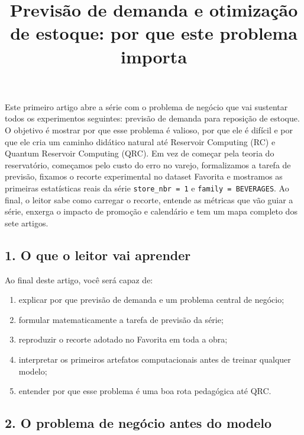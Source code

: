 \documentclass[12pt]{article}
\title{Previsão de demanda e otimização de estoque: por que este problema importa}
\author{}
\providecommand{\tightlist}{%
          \setlength{\itemsep}{0pt}\setlength{\parskip}{0pt}}
\begin{document}
        \maketitle

        \begin{resumo}
        Este primeiro artigo abre a série com o problema de negócio que vai sustentar todos os experimentos seguintes: previsão de demanda para reposição de estoque. O objetivo é mostrar por que esse problema é valioso, por que ele é difícil e por que ele cria um caminho didático natural até Reservoir Computing (RC) e Quantum Reservoir Computing (QRC). Em vez de começar pela teoria do reservatório, começamos pelo custo do erro no varejo, formalizamos a tarefa de previsão, fixamos o recorte experimental no dataset Favorita e mostramos as primeiras estatísticas reais da série \texttt{store\_nbr\ =\ 1} e \texttt{family\ =\ BEVERAGES}. Ao final, o leitor sabe como carregar o recorte, entende as métricas que vão guiar a série, enxerga o impacto de promoção e calendário e tem um mapa completo dos sete artigos.
        \end{resumo}

        \subsection{1. O que o leitor vai aprender}\label{1-o-que-o-leitor-vai-aprender}

Ao final deste artigo, você será capaz de:

\begin{enumerate}
\def\labelenumi{\arabic{enumi}.}
\tightlist
\item
  explicar por que previsão de demanda e um problema central de negócio;
\item
  formular matematicamente a tarefa de previsão da série;
\item
  reproduzir o recorte adotado no Favorita em toda a obra;
\item
  interpretar os primeiros artefatos computacionais antes de treinar qualquer modelo;
\item
  entender por que esse problema é uma boa rota pedagógica até QRC.
\end{enumerate}

\subsection{2. O problema de negócio antes do modelo}\label{2-o-problema-de-neguxf3cio-antes-do-modelo}
\end{document}
